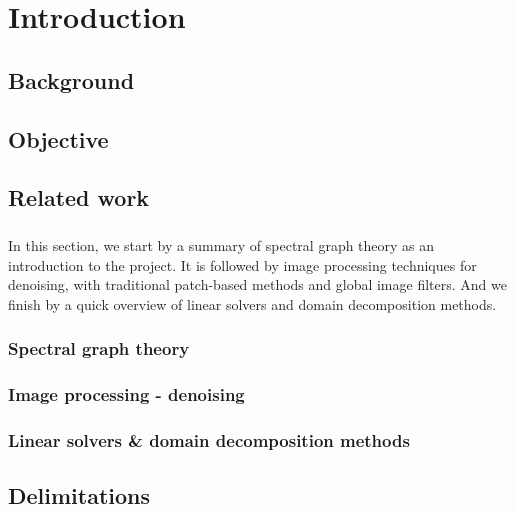 \chapter{Introduction}

\section{Background}


\section{Objective}


\section{Related work}

\paragraph{}
In this section, we start by a summary of spectral graph theory as an introduction to the project.
It is followed by image processing techniques for denoising, with traditional patch-based methods and global image filters.
And we finish by a quick overview of linear solvers and domain decomposition methods.

\subsection{Spectral graph theory}


\subsection{Image processing - denoising}


\subsection{Linear solvers \& domain decomposition methods}


\section{Delimitations}


